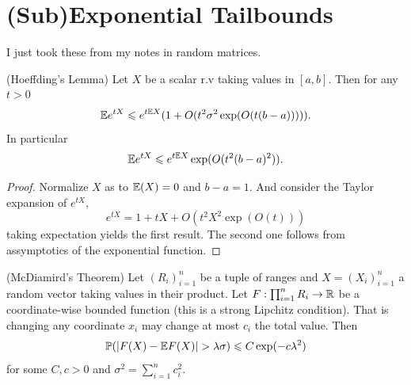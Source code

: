 \section{(Sub)Exponential Tailbounds}

I just took these from my notes in random matrices.

\begin{lemma}
	\label{lemma:hoeff}
	(Hoeffding's Lemma) Let $X$ be a scalar r.v taking values in
	$[a,b]$. Then for any $t > 0$
	\begin{equation}
		\label{lemma:hoef:eq1}
		\mathbb{E} e^{tX} \leqslant e^{t\mathbb{E} X}(1 + O(t^2\sigma^2\exp(O(t(b-a))))).
	\end{equation}
	In particular
	\begin{equation}
		\label{lemma:hoef:eq2}
		\mathbb{E} e^{tX} \leqslant e^{t\mathbb{E} X}\exp(O(t^2(b-a)^2)).
	\end{equation}
\end{lemma}

\begin{proof}
	Normalize $X$ as to $\mathbb{E}(X) = 0$ and $b - a = 1$. And consider the
	Taylor expansion of $e^{tX}$,
	\[
		e^{tX} = 1 + tX + O(t^2X^2\exp(O(t)))
	\]
	taking expectation yields the first result. The second one follows
	from assymptotics of the exponential function.
\end{proof}

\begin{theorem}
	\label{trm:McDiamird}
	(McDiamird's Theorem) Let $(R_i)_{i=1}^n$ be a tuple of ranges
	and $X = (X_i)_{i=1}^{n}$ a random vector taking values in
	their product.
	Let $F: \prod_{i=1}^n R_i \rightarrow \mathbb{R}$ be a coordinate-wise bounded
	function (this is a strong Lipchitz condition). That is changing
	any coordinate $x_i$ may change at most $c_i$ the total value.
	Then
	\[
		\mathbb{P}( |F(X) - \mathbb{E} F(X)| > \lambda \sigma) \leqslant C \exp(-c \lambda^2)
	\]
	for some $C,c > 0$ and $\sigma^2 = \sum_{i=1}^n c_i^2$.
\end{theorem}

